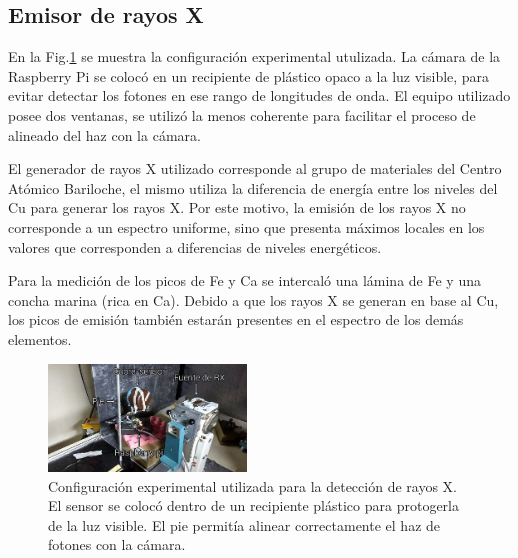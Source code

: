\documentclass[twoside,twocolumn]{article}
\begin{document}
    \subsection{Emisor de rayos X}\label{sec:conf_exp:x-rays}
      En la Fig.\ref{fig:photo_xray} se muestra la configuración experimental utulizada.
      La cámara de la Raspberry Pi se colocó en un recipiente de plástico opaco a la luz visible,
      para evitar detectar los fotones en ese rango de longitudes de onda.
      El equipo utilizado posee dos ventanas, se utilizó la menos coherente para facilitar el proceso
      de alineado del haz con la cámara. 
      
      El generador de rayos X utilizado corresponde al grupo de materiales del Centro Atómico Bariloche,
      el mismo utiliza la diferencia de energía entre los niveles del Cu para generar los rayos X.
      Por este motivo, la emisión de los rayos X no corresponde a un espectro uniforme, sino que presenta
      máximos locales en los valores que corresponden a diferencias de niveles energéticos.
      
      Para la medición de los picos de Fe y Ca se intercaló una lámina de Fe y una concha marina (rica en Ca).
      Debido a que los rayos X se generan en base al Cu, los picos de emisión también estarán presentes en
      el espectro de los demás elementos.

      \begin{figure}[h]
        \includegraphics[width=0.47\textwidth]{figures/IMG_20180412_173110355_HDR}
        \caption{Configuración experimental utilizada para la detección de rayos X.
        El sensor se colocó dentro de un recipiente plástico para protogerla de la luz visible.
        El pie permitía alinear correctamente el haz de fotones con la cámara.
        }
        \label{fig:photo_xray}
      \end{figure}
\end{document}
